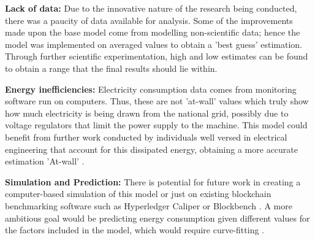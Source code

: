 \textbf{Lack of data:} Due to the innovative nature of the research being conducted, there was a paucity of data available for analysis. Some of the improvements made upon the base model come from modelling non-scientific data; hence the model was implemented on averaged values to obtain a 'best guess' estimation. Through further scientific experimentation, high and low estimates can be found to obtain a range that the final results should lie within. 

\textbf{Energy inefficiencies: } Electricity consumption data comes from monitoring software run on computers. Thus, these are not 'at-wall' values which truly show how much electricity is being drawn from the national grid, possibly due to voltage regulators that limit the power supply to the machine. This model could benefit from further work conducted by individuals well versed in electrical engineering that account for this dissipated energy, obtaining a more accurate estimation 'At-wall' \cite{Warkozek2012ACenters}.

\textbf{Simulation and Prediction: } There is potential for future work in creating a computer-based simulation of this model or just on existing blockchain benchmarking software such as Hyperledger Caliper or Blockbench \cite{Aldweesh2020BenchmarkingApplications}. A more ambitious goal would be predicting energy consumption given different values for the factors included in the model, which would require curve-fitting \cite{IbanezTheExpansion}.

